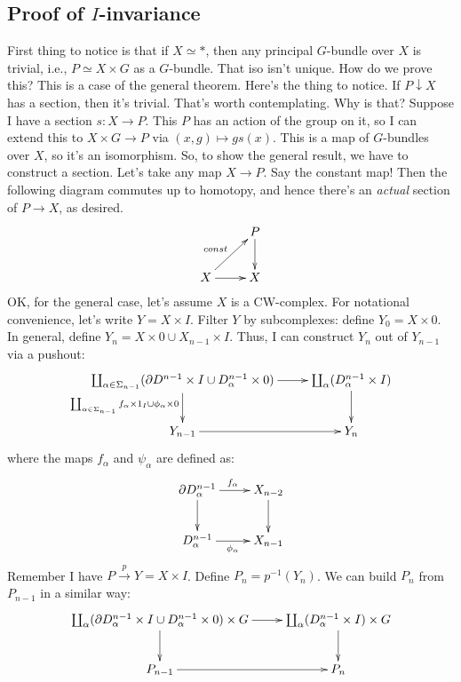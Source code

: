 \subsection{Proof of $I$-invariance}
First thing to notice is that if $X\simeq\ast$, then any principal $G$-bundle over $X$ is trivial, i.e., $P\simeq X\times G$ as a $G$-bundle. That iso isn't unique. How do we prove this? This is a case of the general theorem.
Here's the thing to notice. If $P\downarrow X$ has a section, then it's trivial. That's worth contemplating. Why is that?
Suppose I have a section $s:X\to P$. This $P$ has an action of the group on it, so I can extend this to $X\times G\to P$ via $(x,g)\mapsto gs(x)$.
This is a map of $G$-bundles over $X$, so it's an isomorphism.
So, to show the general result, we have to construct a section. Let's take any map $X\to P$. Say the constant map!
Then the following diagram commutes up to homotopy, and hence there's an \emph{actual} section of $P\to X$, as desired.
\begin{equation*}
    \xymatrix{
	& P\ar[d]\\
	X\ar[ur]^{const}\ar[r] & X
    }
\end{equation*}
OK, for the general case, let's assume $X$ is a CW-complex. For notational convenience, let's write $Y=X\times I$.
Filter $Y$ by subcomplexes: define $Y_0 = X\times 0$.
In general, define $Y_n = X\times 0\cup X_{n-1}\times I$.
Thus, I can construct $Y_n$ out of $Y_{n-1}$ via a pushout:
\begin{equation*}
    \xymatrix{
	\coprod_{\alpha\in\Sigma_{n-1}}(\partial D^{n-1}\times I \cup D^{n-1}_\alpha\times 0) \ar[r]\ar[d]_{\coprod_{\alpha\in\Sigma_{n-1}} f_\alpha\times 1_I\cup\phi_\alpha\times 0} & \coprod_\alpha(D^{n-1}_\alpha\times I) \ar[d]\\
	Y_{n-1}\ar[r] & Y_n
    }
\end{equation*}
where the maps $f_\alpha$ and $\psi_\alpha$ are defined as:
\begin{equation*}
    \xymatrix{
	\partial D^{n-1}_\alpha\ar[r]^{f_\alpha}\ar[d] & X_{n-2}\ar[d]\\
	D^{n-1}_\alpha\ar[r]_{\phi_\alpha} & X_{n-1}
    }
\end{equation*}
Remember I have $P\xrightarrow{p}Y = X\times I$. Define $P_n = p^{-1}(Y_n)$.
We can build $P_n$ from $P_{n-1}$ in a similar way:
\begin{equation*}
    \xymatrix{
	\coprod_\alpha(\partial D^{n-1}_\alpha\times I\cup D^{n-1}_\alpha\times 0)\times G\ar[r]\ar[d] & \coprod_\alpha (D^{n-1}_\alpha\times I)\times G\ar[d]\\
	P_{n-1}\ar[r] & P_n
    }
\end{equation*}
